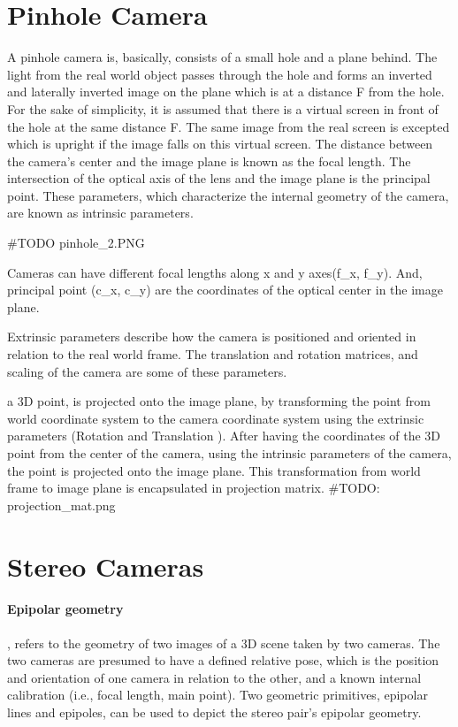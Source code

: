 \documentclass[11pt]{article}
\begin{document}
    \section{Pinhole Camera}

    A pinhole camera is, basically, consists of a small hole and a plane behind. The light from the real world
    object passes through the hole and forms an inverted and laterally inverted image on the plane which is at
    a distance F from the hole. For the sake of simplicity, it is assumed that there is a virtual screen in front
    of the hole at the same distance F. The same image from the real screen is excepted which is upright if the
    image falls on this virtual screen. The distance between the camera's center and the image plane is known
    as the focal length. The intersection of the optical axis of the lens and the image plane is the principal point.
    These parameters, which characterize the internal geometry of the camera, are known as intrinsic parameters.

    #TODO pinhole_2.PNG

    Cameras can have different focal lengths along x and y axes(f_x, f_y). And, principal point (c_x, c_y) are
    the coordinates of the optical center in the image plane.

    Extrinsic parameters describe how the camera is positioned and oriented in relation to the real world frame.
    The translation  and rotation  matrices, and scaling of the camera are some of these parameters.

    a 3D point, is projected onto the image plane, by transforming the point from world coordinate system to
    the camera coordinate system using the extrinsic parameters (Rotation  and Translation ).
    After having the coordinates of the 3D point from the center of the camera, using the intrinsic parameters
    of the camera, the point is projected onto the image plane. This transformation from world frame to image plane
    is encapsulated in projection matrix.
    #TODO: projection_mat.png


    \section{Stereo Cameras}

    \paragraph{Epipolar geometry}, refers to the geometry of two images of a 3D scene taken
    by two cameras. The two cameras are presumed to have a defined relative pose, which is
    the position and orientation of one camera in relation to the other, and a known internal calibration
    (i.e., focal length, main point). Two geometric primitives, epipolar lines and epipoles, can be used
    to depict the stereo pair's epipolar geometry.
\end{document}

